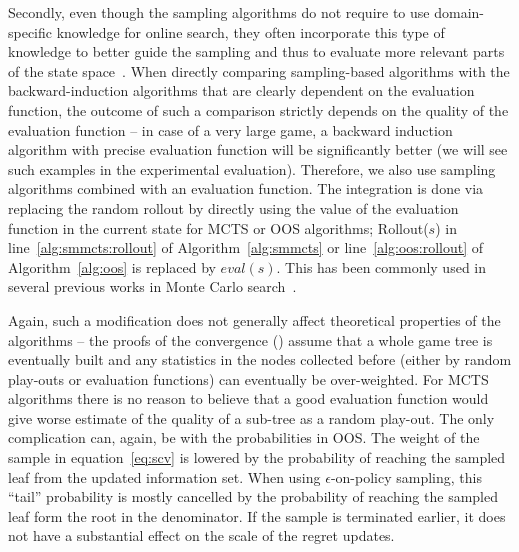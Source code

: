 Secondly, even though the sampling algorithms do not require to use domain-specific knowledge for online search, they often incorporate this type of knowledge to better guide the sampling and thus to evaluate more relevant parts of the state space~\cite{Gelly07Combining,Lorentz08Amazons,Winands10MCTS-LOA,Lorentz13Breakthrough,Lanctot14Implicit}. When directly comparing sampling-based algorithms with the backward-induction algorithms that are clearly dependent on the evaluation function, the outcome of such a comparison strictly depends on the quality of the evaluation function -- in case of a very large game, a backward induction algorithm with precise evaluation function will be significantly better (we will see such examples in the experimental evaluation). Therefore, we also use sampling algorithms combined with an evaluation function. The integration is done via replacing the random rollout
by directly using the value of the evaluation function in the current state for MCTS or OOS algorithms; \ie Rollout($s$) in
line~\ref{alg:smmcts:rollout} of Algorithm~\ref{alg:smmcts} or line~\ref{alg:oos:rollout} of Algorithm~\ref{alg:oos} is replaced by $eval(s)$.
This has been commonly used in several previous works in Monte Carlo search~\cite{Lorentz08Amazons,Lorentz13Breakthrough,Lanctot14Implicit,RamanujanS11,Lanctot13MCMS}.

Again, such a modification does not generally affect theoretical properties of the algorithms -- the proofs of the convergence (\eg \cite{lisy2013-nips}) assume that a whole game tree is eventually built and any statistics in the nodes collected before (either by random play-outs or evaluation functions) can eventually be over-weighted. For MCTS algorithms there is no reason to believe that a good evaluation function would give worse estimate of the quality of a sub-tree as a random play-out. The only complication can, again, be with the probabilities in OOS. The weight of the sample in equation~\ref{eq:scv} is lowered by the probability of reaching the sampled leaf from the updated information set. When using $\epsilon$-on-policy sampling, this ``tail'' probability is mostly cancelled by the probability of reaching the sampled leaf form the root in the denominator. If the sample is terminated earlier, it does not have a substantial effect on the scale of the regret updates.

